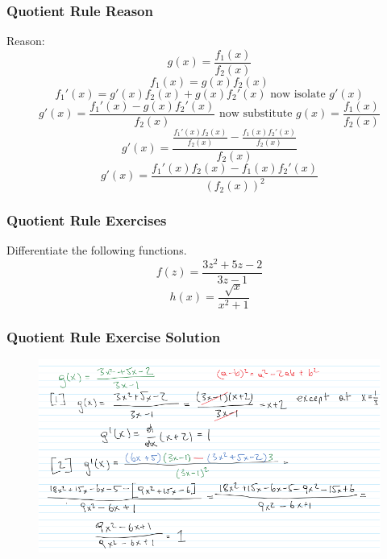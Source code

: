 \documentclass[xcolor=dvipsnames]{beamer}
\begin{document}
\begin{frame}
  \frametitle{Quotient Rule Reason}
Reason:
\begin{equation}
  \label{eq:iebowohc}
g(x)=\frac{f_{1}(x)}{f_{2}(x)}
\end{equation}
\begin{equation}
  \label{eq:iilahthi}
f_{1}(x)=g(x)f_{2}(x)
\end{equation}
\begin{equation}
  \label{eq:eshohhoo}
f_{1}'(x)=g'(x)f_{2}(x)+g(x)f_{2}'(x)\mbox{ now isolate }g'(x)
\end{equation}
\begin{equation}
  \label{eq:iophiewu}
g'(x)=\frac{f_{1}'(x)-g(x)f_{2}'(x)}{f_{2}(x)}\mbox{ now substitute }g(x)=\frac{f_{1}(x)}{f_{2}(x)}
\end{equation}
\begin{equation}
  \label{eq:uhushain}
g'(x)=\frac{\frac{f_{1}'(x)f_{2}(x)}{f_{2}(x)}-\frac{f_{1}(x)f_{2}'(x)}{f_{2}(x)}}{f_{2}(x)}
\end{equation}
\begin{equation}
  \label{eq:requuare}
g'(x)=\frac{f_{1}'(x)f_{2}(x)-f_{1}(x)f_{2}'(x)}{\left(f_{2}(x)\right)^{2}}
\end{equation}
\end{frame}

\begin{frame}
  \frametitle{Quotient Rule Exercises}
{\ubung} Differentiate the following functions.
\begin{equation}
  \label{eq:xookaeji}
f(z)=\frac{3z^{2}+5z-2}{3z-1}
\end{equation}
\begin{equation}
  \label{eq:eidoogow}
h(x)=\frac{\sqrt{x}}{x^{2}+1}
\end{equation}
\end{frame}

\begin{frame}
  \frametitle{Quotient Rule Exercise Solution}
  \begin{figure}[h]
    \includegraphics[scale=0.575]{./diagrams/onenote_ft_09_ProductQuotientRule_02.png}
  \end{figure}
\end{frame}
\end{document}
